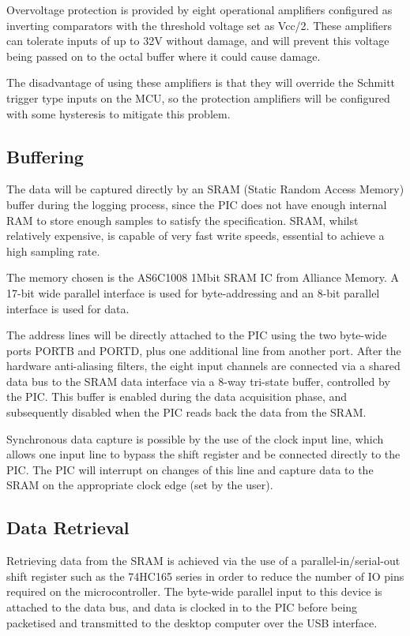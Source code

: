 \documentclass[11pt]{article}
\begin{document}
    Overvoltage protection is provided by eight operational amplifiers
    configured as inverting comparators with the threshold voltage set as
    Vcc/2. These amplifiers can tolerate inputs of up to 32V without damage, and
    will prevent this voltage being passed on to the octal buffer where it could
    cause damage.

    The disadvantage of using these amplifiers is that they will override the
    Schmitt trigger type inputs on the MCU, so the protection amplifiers will be
    configured with some hysteresis to mitigate this problem.

\subsection{Buffering}
    The data will be captured directly by an SRAM (Static Random Access Memory) buffer during the logging process, since the PIC does not have enough internal RAM to store enough samples to satisfy the specification. SRAM, whilst relatively expensive, is capable of very fast write speeds, essential to achieve a high sampling rate.

    The memory chosen is the AS6C1008 1Mbit SRAM IC from Alliance Memory. A 17-bit wide parallel interface is used for byte-addressing and an 8-bit parallel interface is used for data.

    The address lines will be directly attached to the PIC using the two byte-wide ports PORTB and PORTD, plus one additional line from another port. After the hardware anti-aliasing filters, the eight input channels are connected via a shared data bus to the SRAM data interface via a 8-way tri-state buffer, controlled by the PIC. This buffer is enabled during the data acquisition phase, and subsequently disabled when the PIC reads back the data from the SRAM.

    Synchronous data capture is possible by the use of the clock input line, which allows one input line to bypass the shift register and be connected directly to the PIC.  The PIC will interrupt on changes of this line and capture data to the SRAM on the appropriate clock edge (set by the user).

\subsection{Data Retrieval}
    Retrieving data from the SRAM is achieved via the use of a parallel-in/serial-out shift register such as the 74HC165 series in order to reduce the number of IO pins required on the microcontroller. The byte-wide parallel input to this device is attached to the data bus, and data is clocked in to the PIC before being packetised and transmitted to the desktop computer over the USB interface.
\end{document}
